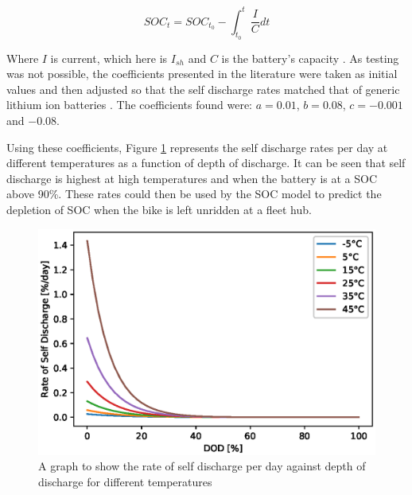 \documentclass[a4paper, 10pt]{article}
\numberwithin{equation}{section}
\begin{document}
\begin{equation}
    SOC_{t} = SOC_{t_{0}} - \int_{t_{0}}^{t} \frac{I}{C} dt
\label{eqn:coulomb_counting}
\end{equation}

Where $I$ is current, which here is $I_{sh}$ and $C$ is the battery's capacity \cite{report:SD_eqn}. As testing was not possible, the coefficients presented in the literature were taken as initial values and then adjusted so that the self discharge rates matched that of generic lithium ion batteries \cite{report:SD_eqn}\cite{report:SD_rate_2}\cite{web:SD_rate_1}. The coefficients found were: $a=0.01$, $b=0.08$, $c=-0.001$ and $-0.08$.

Using these coefficients, Figure \ref{fig:SD_temp} represents the self discharge rates per day at different temperatures as a function of depth of discharge. It can be seen that self discharge is highest at high temperatures and when the battery is at a SOC above 90\%. These rates could then be used by the SOC model to predict the depletion of SOC when the bike is left unridden at a fleet hub.

\begin{figure}[H]
    \centering
    \includegraphics[width=0.5\linewidth]{images/SD_temp.eps}
    \caption{A graph to show the rate of self discharge per day against depth of discharge for different temperatures}
    \label{fig:SD_temp}
\end{figure}
\end{document}
